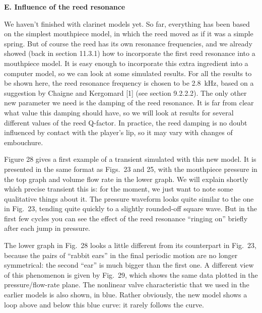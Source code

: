   \textbf{E. Influence of the reed resonance} 

  We haven’t finished with clarinet models yet. So far, everything has been 
  based on the simplest mouthpiece model, in which the reed moved as if it was 
  a simple spring. But of course the reed has its own resonance frequencies, 
  and we already showed (back in section 11.3.1) how to incorporate the first 
  reed resonance into a mouthpiece model. It is easy enough to incorporate this 
  extra ingredient into a computer model, so we can look at some simulated 
  results. For all the results to be shown here, the reed resonance frequency 
  is chosen to be 2.8~kHz, based on a suggestion by Chaigne and Kergomard [1] 
  (see section 9.2.2.2). The only other new parameter we need is the damping of 
  the reed resonance. It is far from clear what value this damping should have, 
  so we will look at results for several different values of the reed Q-factor. 
  In practice, the reed damping is no doubt influenced by contact with the 
  player's lip, so it may vary with changes of embouchure. 

  Figure 28 gives a first example of a transient simulated with this new model. 
  It is presented in the same format as Figs.\ 23 and 25, with the mouthpiece 
  pressure in the top graph and volume flow rate in the lower graph. We will 
  explain shortly which precise transient this is: for the moment, we just want 
  to note some qualitative things about it. The pressure waveform looks quite 
  similar to the one in Fig.\ 23, tending quite quickly to a slightly 
  rounded-off square wave. But in the first few cycles you can see the effect 
  of the reed resonance “ringing on” briefly after each jump in pressure. 


  The lower graph in Fig.\ 28 looks a little different from its counterpart in 
  Fig.\ 23, because the pairs of “rabbit ears” in the final periodic motion are 
  no longer symmetrical: the second “ear” is much bigger than the first one. A 
  different view of this phenomenon is given by Fig.\ 29, which shows the same 
  data plotted in the pressure/flow-rate plane. The nonlinear valve 
  characteristic that we used in the earlier models is also shown, in blue. 
  Rather obviously, the new model shows a loop above and below this blue curve: 
  it rarely follows the curve. 

